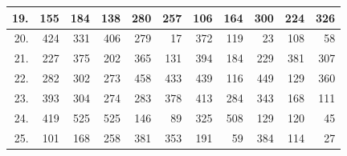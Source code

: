 \begin{table}[H]
{\begin{tabular}{|r|r|r|r|r|r|r|r|r|r|r|}
19.                    & 155                            & 184                             & 138                              & 280                              & 257                              & 106                              & 164                              & 300                              & 224                              & 326                              \\ \hline
20.                    & 424                            & 331                             & 406                              & 279                              & 17                               & 372                              & 119                              & 23                               & 108                              & 58                               \\ \hline
21.                    & 227                            & 375                             & 202                              & 365                              & 131                              & 394                              & 184                              & 229                              & 381                              & 307                              \\ \hline
22.                    & 282                            & 302                             & 273                              & 458                              & 433                              & 439                              & 116                              & 449                              & 129                              & 360                              \\ \hline
23.                    & 393                            & 304                             & 274                              & 283                              & 378                              & 413                              & 284                              & 343                              & 168                              & 111                              \\ \hline
24.                    & 419                            & 525                             & 525                              & 146                              & 89                               & 325                              & 508                              & 129                              & 120                              & 45                               \\ \hline
25.                    & 101                            & 168                             & 258                              & 381                              & 353                              & 191                              & 59                               & 384                              & 114                              & 27                               \\ \hline

\end{tabular}}
\end{table}
